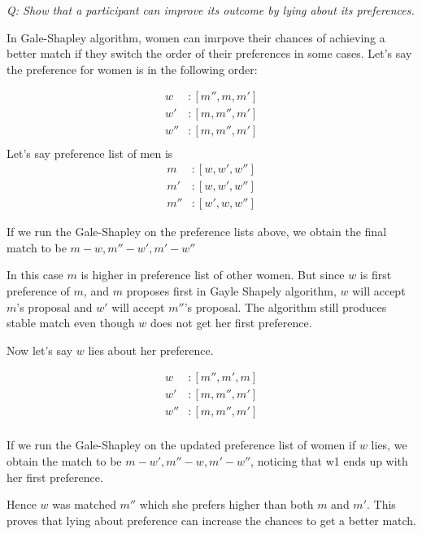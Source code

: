 \documentclass{homeworg}
\begin{document}
\newpage

\exercise
\emph{Q: Show that a participant can improve its outcome by lying about its preferences.}

In Gale-Shapley algorithm, women can imrpove their chances of achieving a better match if they switch the order of their preferences in some cases. Let's say the preference for women is in the following order:

\begin{align*}
    w &: [m'' , m , m']\\
    w'&: [m, m'', m']\\
    w''&:[m, m'', m']\\
\end{align*}
Let's say preference list of men is
\begin{align*}
    m &: [w , w' , w'']\\
    m'&:[w , w' , w'']\\
    m''&: [w', w, w'']
\end{align*}

If we run the Gale-Shapley on the preference lists above, we obtain the final match to be $m-w, m''-w', m'-w''$

In this case $m$ is higher in preference list of other women. But since $w$ is first preference of $m$, and $m$ proposes first in Gayle Shapely algorithm, $w$  will accept $m$'s proposal and $w'$ will accept $m''$'s proposal. The algorithm still produces stable match even though $w$ does not get her first preference. 

Now let's say $w$ lies about her preference. 

\begin{align*}
    w &: [m'' , m' , m]\\
    w'&: [m, m'', m']\\
    w''&:[m, m'', m']\\
\end{align*}

If we run the Gale-Shapley on the updated preference list of women if $w$ lies, we obtain the match to be $m-w', m''-w, m'-w''$, noticing that w1 ends up with her first preference.

Hence $w$ was matched $m''$ which she prefers higher than both $m$ and $m'$. This proves that lying about preference can increase the chances to get a better match. 
\newpage

\exercise
\end{document}
